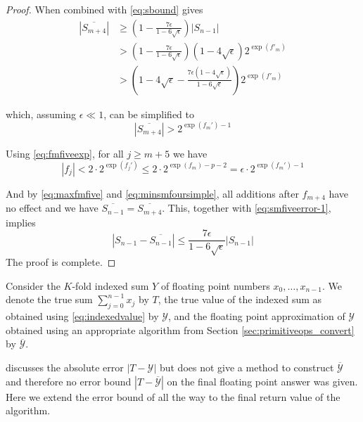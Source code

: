 \begin{proof}
      When combined with \eqref{eq:sbound} gives
      \begin{align*}
        \left|\overline{S_{m+4}}\right|
        & \geq \left(1-\frac{7 \epsilon}{1-6\sqrt{\epsilon}}\right) |S_{n-1}| \\
        & > \left(1-\frac{7 \epsilon}{1-6\sqrt{\epsilon}}\right) \left(1-4\sqrt{\epsilon}\right) 2^{\exp(f'_m)} \\
        & > \left(1-4\sqrt{\epsilon} - \frac{7 \epsilon \left(1-4\sqrt{\epsilon}\right)}{1-6\sqrt{\epsilon}}\right) 2^{\exp(f'_m)}
      \end{align*}

      which, assuming $\epsilon \ll 1$, can be simplified to
      \begin{equation}
        \left|\overline{S_{m + 4}}\right| > 2^{\exp(f_m') - 1}
        \label{eq:minsmfoursimple}
      \end{equation}

      Using  \eqref{eq:fmfiveexp}, for all $j \geq m + 5$ we have
      \begin{equation}
        |f_j| < 2 \cdot 2^{\exp(f_j')} \leq 2 \cdot 2^{\exp(f_m) - p - 2} = \epsilon \cdot 2^{\exp(f_m') - 1}
        \label{eq:maxfmfive}
      \end{equation}

      And by \eqref{eq:maxfmfive} and \eqref{eq:minsmfoursimple}, all additions
      after $f_{m + 4}$ have no effect and we have $\overline{S_{n-1}} = \overline{S_{m+4}}$.
      This, together with \eqref{eq:smfiveerror-1}, implies
      \begin{equation*}
        \left|S_{n-1} - \overline{S_{n-1}}\right| \leq \frac{7\epsilon}{1-6\sqrt{\epsilon}} |S_{n-1}|
      \end{equation*}
      The proof is complete.
    \end{proof}

    Consider the $K$-fold indexed sum $Y$ of floating point numbers $x_0, \ldots, x_{n - 1}$.
    We denote the true sum $\sum \limits_{j = 0}^{n - 1} x_j$ by $T$, the true
    value of the indexed sum as obtained using \eqref{eq:indexedvalue} by
    $\mathcal{Y}$, and the floating point approximation of $\mathcal{Y}$
    obtained using an appropriate algorithm from Section
    \ref{sec:primitiveops_convert} by $\overline{\mathcal{Y}}$.

    \cite{repsum} discusses the absolute error $|T - \mathcal{Y}|$ but does not
    give a method to construct $\overline{\mathcal{Y}}$ and therefore no error
    bound $|T - \overline{\mathcal{Y}}|$ on the final floating point answer
    was given. Here we extend the error bound of \cite{repsum} all the way to
    the final return value of the algorithm.

